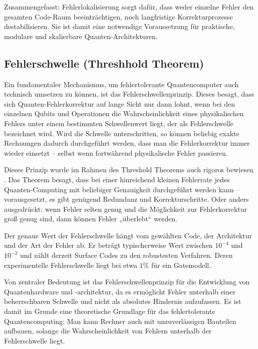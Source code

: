 Zusammengefasst: Fehlerlokalisierung sorgt dafür, dass weder einzelne Fehler den gesamten Code-Raum beeinträchtigen, noch langfristige Korrekturprozesse destabilisieren. Sie ist damit eine notwendige Voraussetzung für praktische, modulare und skalierbare Quanten-Architekturen.

\subsection{Fehlerschwelle (Threshhold Theorem)}
Ein fundamentaler Mechanismus, um fehlertolerante Quantencomputer auch technisch umsetzen zu können, ist das Fehlerschwellenprinzip. Dieses besagt, dass sich Quanten-Fehlerkorrektur auf lange Sicht nur dann lohnt, wenn bei den einzelnen Qubits und Operationen die Wahrscheinlichkeit eines physikalischen Fehlers unter einem bestimmten Schwellenwert liegt, der als Fehlerschwelle bezeichnet wird. Wird die Schwelle unterschritten, so können beliebig exakte Rechnungen dadurch durchgeführt werden, dass man die Fehlerkorrektur immer wieder einsetzt – selbst wenn fortwährend physikalische Fehler passieren. \cite[Seite 454-456]{nielsen_michael_a_and_isaac_l_chuang_quantum_2010}

Dieses Prinzip wurde im Rahmen des Threshold Theorems auch rigoros bewiesen \cite{Aharonov und Ben-Or}. Das Theorem besagt, dass bei einer hinreichend kleinen Fehlerrate jedes Quanten-Computing mit beliebiger Genauigkeit durchgeführt werden kann – vorausgesetzt, es gibt genügend Redundanz und Korrekturschritte. Oder anders ausgedrückt: wenn Fehler selten genug und die Möglichkeit zur Fehlerkorrektur groß genug sind, dann können Fehler „überlebt“ werden.

Der genaue Wert der Fehlerschwelle hängt vom gewählten Code, der Architektur und der Art der Fehler ab. Er beträgt typischerweise  Wert zwischen \(
    10^{-4}
\)  und \(
    10^{-2}
\) und zählt derzeit Surface Codes zu den robustesten Verfahren. Deren experimentelle Fehlerschwelle liegt bei etwa \(1 \%\) für 
ein Gatemodell. \cite{Fowler et al.}

Von zentraler Bedeutung ist das Fehlerschwellenprinzip für die Entwicklung von Quantenhardware und -architektur, da es ermöglicht Fehler unterhalb einer beherrschbaren Schwelle und nicht als absolutes Hindernis aufzufassen. Es ist damit im Grunde eine theoretische Grundlage für das fehlertolerante Quantencomputing: Man kann Rechner auch mit unzuverlässigen Bauteilen aufbauen, solange die Wahrscheinlichkeit von Fehlern unterhalb der Fehlerschwelle liegt.

